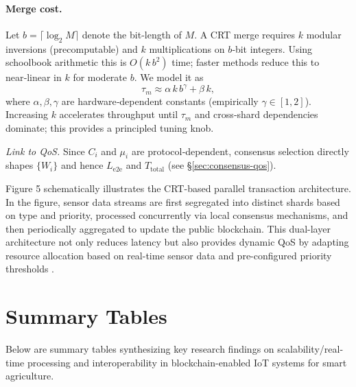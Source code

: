 \documentclass[12pt,onecolumn]{IEEEtran} %
\begin{document}
\paragraph{Merge cost.}
Let $b=\lceil\log_2 M\rceil$ denote the bit‑length of $M$. A CRT merge requires $k$ modular inversions (precomputable) and $k$ multiplications on $b$‑bit integers. Using schoolbook arithmetic this is $O(k\,b^2)$ time; faster methods reduce this to near‑linear in $k$ for moderate $b$. We model it as
\[
\tau_m \approx \alpha\,k\,b^{\gamma} + \beta\,k,
\]
where $\alpha,\beta,\gamma$ are hardware‑dependent constants (empirically $\gamma\in[1,2]$). Increasing $k$ accelerates throughput until $\tau_m$ and cross‑shard dependencies dominate; this provides a principled tuning knob.

\noindent\textit{Link to QoS.} Since $C_i$ and $\mu_i$ are protocol‑dependent, consensus selection directly shapes $\{W_i\}$ and hence $L_{\mathrm{e2e}}$ and $T_{\mathrm{total}}$ (see §\ref{sec:consensus-qos}).


Figure 5 \cite{thiruvenkatasamy2025anonlinetool} schematically illustrates the CRT-based parallel transaction architecture. In the figure, sensor data streams are first segregated into distinct shards based on type and priority, processed concurrently via local consensus mechanisms, and then periodically aggregated to update the public blockchain. This dual-layer architecture not only reduces latency but also provides dynamic QoS by adapting resource allocation based on real-time sensor data and pre-configured priority thresholds \cite{thiruvenkatasamy2025anonlinetool, huang2025digitaltraceabilityin}.

\section{Summary Tables}
Below are summary tables synthesizing key research findings on scalability/real-time processing and interoperability in blockchain-enabled IoT systems for smart agriculture.
\end{document}
